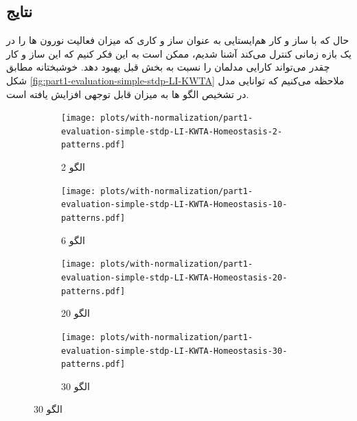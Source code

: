     \subsection{نتایج}
        حال که با ساز و کار هم‌ایستایی به عنوان ساز و کاری که میزان فعالیت نورون ها را در یک بازه زمانی کنترل می‌کند آشنا شدیم، ممکن است به این فکر کنیم که این ساز و کار چقدر می‌تواند کارایی مدلمان را نسبت به بخش قبل بهبود دهد. خوشبختانه مطابق شکل 
        \ref{fig:part1-evaluation-simple-stdp-LI-KWTA}
        ملاحظه می‌کنیم که توانایی مدل در تشخیص الگو ها به میزان قابل توجهی افزایش یافته است.

        \begin{figure}[!ht]
            \centering
            \begin{adjustbox}{minipage=\linewidth,scale=1}
                \begin{subfigure}[b]{0.5\textwidth}
                    \centering
                    \texttt{[image: plots/with-normalization/part1-evaluation-simple-stdp-LI-KWTA-Homeostasis-2-patterns.pdf]}
                    \caption{2 الگو}
                    \label{fig:part1-evaluation-simple-stdp-LI-KWTA-2-patterns}
                \end{subfigure}
                \hfill
                \begin{subfigure}[b]{0.5\textwidth}
                    \centering
                    \texttt{[image: plots/with-normalization/part1-evaluation-simple-stdp-LI-KWTA-Homeostasis-10-patterns.pdf]}
                    \caption{6 الگو}
                    \label{fig:part1-evaluation-simple-stdp-LI-KWTA-4-patterns}
                \end{subfigure}
                \vfill
                \begin{subfigure}[b]{0.5\textwidth}
                    \centering
                    \texttt{[image: plots/with-normalization/part1-evaluation-simple-stdp-LI-KWTA-Homeostasis-20-patterns.pdf]}
                    \caption{20 الگو}
                    \label{fig:part1-evaluation-simple-stdp-LI-KWTA-6-patterns}
                \end{subfigure}
                \hfill
                \begin{subfigure}[b]{0.5\textwidth}
                    \centering
                    \texttt{[image: plots/with-normalization/part1-evaluation-simple-stdp-LI-KWTA-Homeostasis-30-patterns.pdf]}
                    \caption{30 الگو}
                    \label{fig:part1-evaluation-simple-stdp-LI-KWTA-15-patterns}
                \end{subfigure}

\end{adjustbox}
\end{figure}
